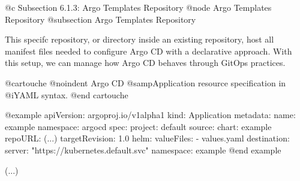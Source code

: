 @c Subsection 6.1.3: Argo Templates Repository
@node Argo Templates Repository
@subsection Argo Templates Repository

This specifc repository, or directory inside an existing repository, host all manifest files needed to configure Argo CD with a declarative approach. With this setup, we can manage how Argo CD behaves through GitOps practices.

@cartouche
@noindent Argo CD @samp{Application} resource specification in @i{YAML} syntax.
@end cartouche

@example
apiVersion: argoproj.io/v1alpha1
kind: Application
metadata:
  name: example
  namespace: argocd
spec:
  project: default
  source:
    chart: example
    repoURL: (...)
    targetRevision: 1.0
    helm:
      valueFiles:
        - values.yaml
  destination:
    server: "https://kubernetes.default.svc"
    namespace: example
@end example

(...)

